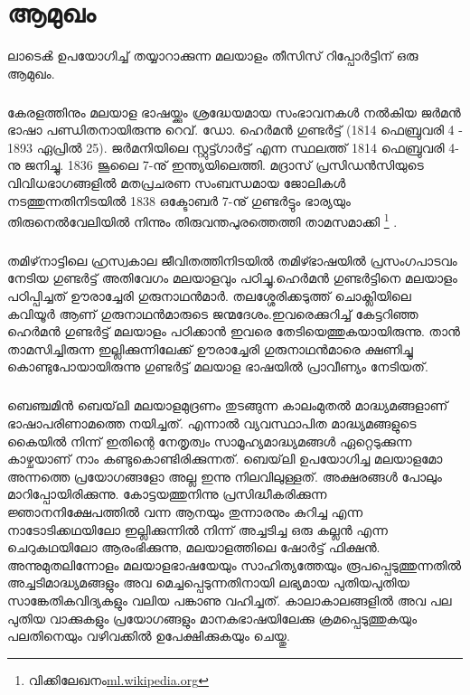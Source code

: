  
\chapter{ആമുഖം}

ലാടെൿ ഉപയോഗിച്ച് തയ്യാറാക്കുന്ന മലയാളം തീസിസ് റിപ്പോർട്ടിന് ഒരു ആമുഖം.

\paragraph{}
 കേരളത്തിനും മലയാള ഭാഷയ്ക്കും ശ്രദ്ധേയമായ സംഭാവനകൾ നൽകിയ ജർമൻ ഭാഷാ പണ്ഡിതനായിരുന്നു റെവ്. ഡോ. ഹെർമൻ ഗുണ്ടർട്ട് (1814 ഫെബ്രുവരി 4 - 1893 ഏപ്രിൽ 25). ജർമനിയിലെ സ്റ്റുട്ട്ഗാർട്ട് എന്ന സ്ഥലത്ത് 1814 ഫെബ്രുവരി 4-നു ജനിച്ചു. 1836 ജൂലൈ 7-നു് ഇന്ത്യയിലെത്തി. മദ്രാസ് പ്രസിഡൻസിയുടെ വിവിധഭാഗങ്ങളിൽ മതപ്രചരണ സംബന്ധമായ ജോലികൾ നടത്തുന്നതിനിടയിൽ 1838 ഒക്ടോബർ 7-നു് ഗുണ്ടർട്ടും ഭാര്യയും തിരുനെൽവേലിയിൽ നിന്നും തിരുവന്തപുരത്തെത്തി താമസമാക്കി  \footnote{വിക്കിലേഖനം\url{ml.wikipedia.org}} .

\paragraph{}
തമിഴ്‌നാട്ടിലെ ഹ്രസ്വകാല ജീവിതത്തിനിടയിൽ തമിഴ്ഭാഷയിൽ പ്രസംഗപാടവം നേടിയ ഗുണ്ടർട്ട് അതിവേഗം മലയാളവും പഠിച്ചു.ഹെർമൻ ഗുണ്ടർട്ടിനെ മലയാളം പഠിപ്പിച്ചത് ഊരാച്ചേരി ഗുരുനാഥൻമാർ. തലശ്ശേരിക്കടുത്ത് ചൊക്ലിയിലെ കവിയൂർ ആണ് ഗുരുനാഥൻമാരുടെ ജന്മദേശം.ഇവരെക്കുറിച്ച് കേട്ടറിഞ്ഞ ഹെർമൻ ഗുണ്ടർട്ട് മലയാളം പഠിക്കാൻ ഇവരെ തേടിയെത്തുകയായിരുന്നു. താൻ താമസിച്ചിരുന്ന ഇല്ലിക്കുന്നിലേക്ക് ഊരാച്ചേരി ഗുരുനാഥൻമാരെ ക്ഷണിച്ചു കൊണ്ടുപോയായിരുന്നു ഗുണ്ടർട്ട് മലയാള ഭാഷയിൽ പ്രാവീണ്യം നേടിയത്. 

\paragraph{}
ബെഞ്ചമിൻ ബെയ്‌ലി മലയാളമുദ്രണം തുടങ്ങുന്ന കാലംമുതൽ മാദ്ധ്യമങ്ങളാണ് ഭാഷാപരിണാമത്തെ നയിച്ചത്. എന്നാൽ വ്യവസ്ഥാപിത മാദ്ധ്യമങ്ങളുടെ കൈയിൽ നിന്ന് ഇതിന്റെ നേതൃത്വം സാമൂഹ്യമാദ്ധ്യമങ്ങൾ ഏറ്റെടുക്കുന്ന കാഴ്ചയാണ് നാം കണ്ടുകൊണ്ടിരിക്കുന്നത്. ബെയ്‌ലി ഉപയോഗിച്ച മലയാളമോ അന്നത്തെ പ്രയോഗങ്ങളോ അല്ല ഇന്നു നിലവിലുള്ളത്. അക്ഷരങ്ങൾ പോലും മാറിപ്പോയിരിക്കുന്നു. കോട്ടയത്തുനിന്നു പ്രസിദ്ധീകരിക്കുന്ന ജ്ഞാനനിക്ഷേപത്തിൽ വന്ന ആനയും തുന്നാരനും കുറിച്ച എന്ന നാടോടിക്കഥയിലോ ഇല്ലിക്കുന്നിൽ നിന്ന് അച്ചടിച്ച ഒരു കല്ലൻ എന്ന ചെറുകഥയിലോ ആരംഭിക്കുന്നു, മലയാളത്തിലെ ഷോർട്ട് ഫിക്ഷൻ. അന്നുമുതലിന്നോളം മലയാളഭാഷയേയും സാഹിത്യത്തേയും രൂപപ്പെടുത്തുന്നതിൽ അച്ചടിമാദ്ധ്യമങ്ങളും അവ മെച്ചപ്പെടുന്നതിനായി ലഭ്യമായ പുതിയപുതിയ സാങ്കേതികവിദ്യകളും വലിയ പങ്കാണു വഹിച്ചത്. കാലാകാലങ്ങളിൽ അവ പല പുതിയ വാക്കുകളും പ്രയോഗങ്ങളും മാനകഭാഷയിലേക്കു ക്രമപ്പെടുത്തുകയും പലതിനെയും വഴിവക്കിൽ ഉപേക്ഷിക്കുകയും ചെയ്തു\cite{bailey}. 